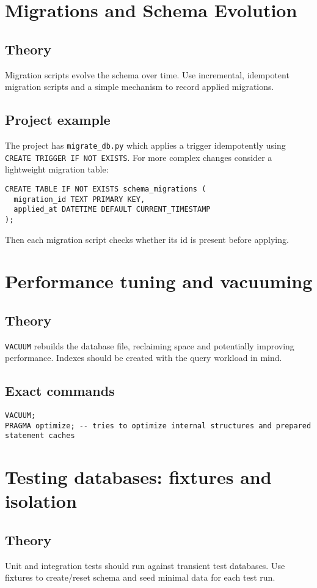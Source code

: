 \documentclass[11pt,a4paper]{article}
\begin{document}
\section{Migrations and Schema Evolution}
\subsection{Theory}
Migration scripts evolve the schema over time. Use incremental, idempotent migration scripts and a simple mechanism to record applied migrations.

\subsection{Project example}
The project has \texttt{migrate_db.py} which applies a trigger idempotently using \texttt{CREATE TRIGGER IF NOT EXISTS}. For more complex changes consider a lightweight migration table:
\begin{lstlisting}
CREATE TABLE IF NOT EXISTS schema_migrations (
  migration_id TEXT PRIMARY KEY,
  applied_at DATETIME DEFAULT CURRENT_TIMESTAMP
);
\end{lstlisting}
Then each migration script checks whether its id is present before applying.

\section{Performance tuning and vacuuming}
\subsection{Theory}
\texttt{VACUUM} rebuilds the database file, reclaiming space and potentially improving performance. Indexes should be created with the query workload in mind.

\subsection{Exact commands}
\begin{lstlisting}
VACUUM;
PRAGMA optimize; -- tries to optimize internal structures and prepared statement caches
\end{lstlisting}

\section{Testing databases: fixtures and isolation}
\subsection{Theory}
Unit and integration tests should run against transient test databases. Use fixtures to create/reset schema and seed minimal data for each test run.
\end{document}
